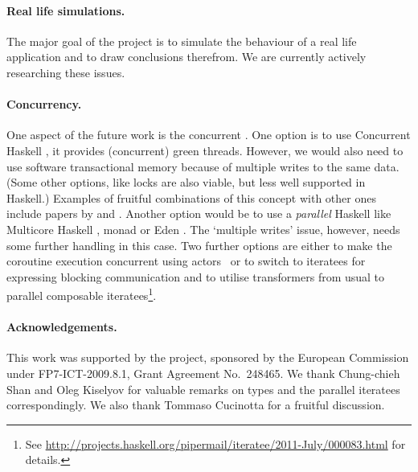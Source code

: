 \paragraph{Real life simulations.}
The major goal of the project is to simulate the behaviour of a real life application and to draw conclusions therefrom.
We are currently actively researching these issues.

\paragraph{Concurrency.}
One aspect of the future work is the concurrent \soosim.
One option is to use Concurrent Haskell \cite{ConcHs}, it provides (concurrent) green threads.
However, we would also need to use software transactional memory
\cite{springerlink:10.1007/s004460050028} because of multiple writes
to the same data. (Some other options, like locks are also viable, but
less well supported in Haskell.)
Examples of fruitful combinations of this concept with other ones include papers by \citeauthor{Harris:2008:CMT:1378704.1378725} \cite{Harris:2008:CMT:1378704.1378725} and \citeauthor{Bieniusa:2010:BAA:1835698.1835714} \cite{Bieniusa:2010:BAA:1835698.1835714,springerlink:10.1007/978-3-642-25959-3_2}.
Another option would be to use a \emph{parallel} Haskell like Multicore Haskell \cite{marlow:rsm},  monad \cite{par-monad} or Eden \cite{eden}.
The `multiple writes' issue, however, needs some further handling in this case.
Two further options are either to make the coroutine execution concurrent using actors~\cite{Hewitt:1973:UMA:1624775.1624804,sulzmann2008actors} or to switch to iteratees for expressing blocking communication and to utilise transformers from usual to parallel composable iteratees\footnote{See \url{http://projects.haskell.org/pipermail/iteratee/2011-July/000083.html} for details.}.

%

\paragraph{Acknowledgements.}
This work was supported by the \soos project, sponsored by the European Commission under FP7-ICT-2009.8.1, Grant Agreement No.~248465.
We thank Chung-chieh Shan and Oleg Kiselyov for valuable remarks on
 types and the parallel iteratees correspondingly.
We also thank Tommaso Cucinotta for a fruitful discussion.

